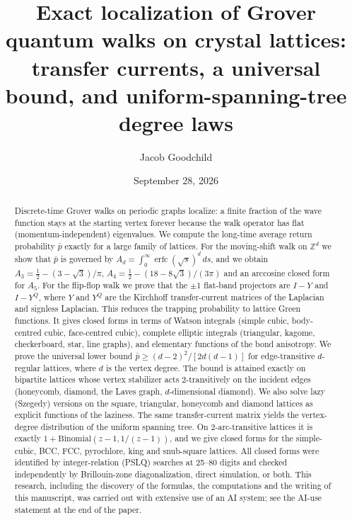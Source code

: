 \documentclass[aps,pra,10pt,twocolumn,superscriptaddress,nofootinbib]{revtex4-2}
\newcommand{\pbar}{\bar{p}}
\newcommand{\erfc}{\operatorname{erfc}}
\newcommand{\sq}{\sqrt{3}}
\newcommand{\YQ}{Y^{Q}}
\begin{document}
\title{Exact localization of Grover quantum walks on crystal lattices:\\
transfer currents, a universal bound, and uniform-spanning-tree degree laws}

\author{Jacob Goodchild}

\date{September 28, 2026}

\begin{abstract}
Discrete-time Grover walks on periodic graphs localize: a finite fraction of the
wave function stays at the starting vertex forever because the walk operator
has flat (momentum-independent) eigenvalues. We compute the long-time average
return probability $\pbar$ exactly for a large family of lattices. For the
moving-shift walk on $\mathbb{Z}^d$ we show that
$\pbar$ is governed by $A_d=\int_0^\infty \erfc(\sqrt{s})^d\,ds$, and we obtain
$A_3=\tfrac12-(3-\sq)/\pi$,
$A_4=\tfrac12-(18-8\sq)/(3\pi)$ and an arccosine closed form for $A_5$.
For the flip-flop walk we prove that the $\pm1$ flat-band projectors are
$I-Y$ and $I-\YQ$, where $Y$ and $\YQ$ are the Kirchhoff transfer-current matrices
of the Laplacian and signless Laplacian. This reduces the trapping probability to
lattice Green functions. It gives closed forms in terms of Watson integrals
(simple cubic, body-centred cubic, face-centred cubic), complete elliptic
integrals (triangular, kagome, checkerboard, star, line graphs), and elementary
functions of the bond anisotropy. We prove the universal lower bound
$\pbar\ge (d-2)^2/[2d(d-1)]$ for edge-transitive $d$-regular lattices, where $d$
is the vertex degree. The bound is attained exactly on bipartite lattices whose vertex
stabilizer acts 2-transitively on the incident edges (honeycomb, diamond, the
Laves graph, $d$-dimensional diamond). We also solve lazy (Szegedy) versions on the
square, triangular, honeycomb and diamond lattices as explicit functions of the
laziness. The same transfer-current matrix yields the vertex-degree distribution
of the uniform spanning tree. On 2-arc-transitive lattices it is exactly
$1+\mathrm{Binomial}(z-1,1/(z-1))$, and we give closed forms for the simple-cubic,
BCC, FCC, pyrochlore, king and snub-square lattices. All closed forms were
identified by integer-relation (PSLQ) searches at 25--80 digits and checked
independently by Brillouin-zone diagonalization, direct simulation, or both.
This research, including the discovery of the formulas, the computations and
the writing of this manuscript, was carried out with extensive use of an AI
system; see the AI-use statement at the end of the paper.
\end{abstract}
\end{document}
